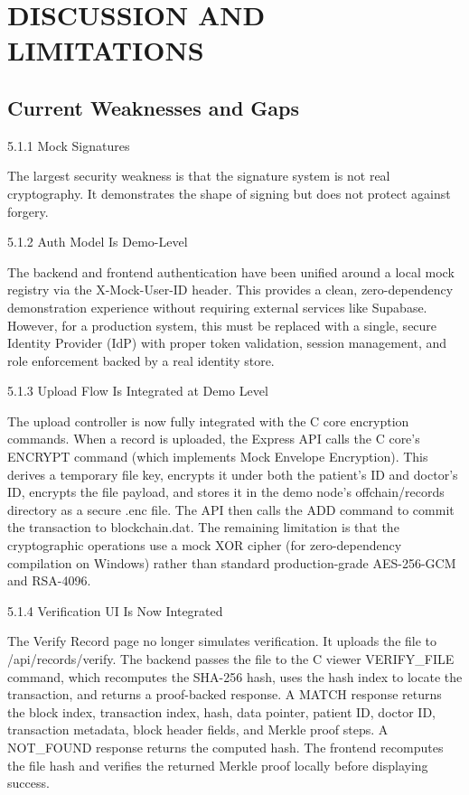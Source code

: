 \documentclass[12pt]{article}
\begin{document}
\newpage
\section{DISCUSSION AND LIMITATIONS}

\subsection{Current Weaknesses and Gaps}

5.1.1 Mock Signatures

The largest security weakness is that the signature system is not real cryptography. It demonstrates the shape of signing but does not protect against forgery.

5.1.2 Auth Model Is Demo-Level

The backend and frontend authentication have been unified around a local mock registry via the X-Mock-User-ID header. This provides a clean, zero-dependency demonstration experience without requiring external services like Supabase. However, for a production system, this must be replaced with a single, secure Identity Provider (IdP) with proper token validation, session management, and role enforcement backed by a real identity store.

5.1.3 Upload Flow Is Integrated at Demo Level

The upload controller is now fully integrated with the C core encryption commands. When a record is uploaded, the Express API calls the C core's ENCRYPT command (which implements Mock Envelope Encryption). This derives a temporary file key, encrypts it under both the patient's ID and doctor's ID, encrypts the file payload, and stores it in the demo node's offchain/records directory as a secure .enc file. The API then calls the ADD command to commit the transaction to blockchain.dat. The remaining limitation is that the cryptographic operations use a mock XOR cipher (for zero-dependency compilation on Windows) rather than standard production-grade AES-256-GCM and RSA-4096.

5.1.4 Verification UI Is Now Integrated

The Verify Record page no longer simulates verification. It uploads the file to /api/records/verify. The backend passes the file to the C viewer VERIFY\_FILE command, which recomputes the SHA-256 hash, uses the hash index to locate the transaction, and returns a proof-backed response. A MATCH response returns the block index, transaction index, hash, data pointer, patient ID, doctor ID, transaction metadata, block header fields, and Merkle proof steps. A NOT\_FOUND response returns the computed hash. The frontend recomputes the file hash and verifies the returned Merkle proof locally before displaying success.
\end{document}
